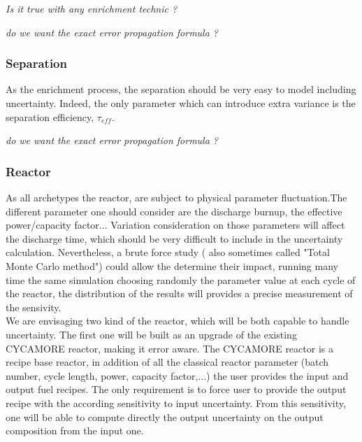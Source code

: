 \documentclass[dvips,12pt]{article}
\begin{document}
\textit{Is it true with any enrichment technic ?}

\textit{do we want the exact error propagation formula ?}

\subsubsection{Separation}
As the enrichment process, the separation should
be very easy to model including
uncertainty. Indeed, the only parameter which can
introduce extra variance is the separation
efficiency, $\tau_{eff}$.



\textit{do we want the exact error propagation formula ?}

\subsubsection{Reactor}
As all archetypes the reactor, are subject to
physical parameter fluctuation.The different
parameter one should consider are the discharge
burnup, the effective power/capacity
factor... Variation consideration on those
parameters will affect the discharge time, which
should be very difficult to include in the
uncertainty calculation. Nevertheless, a brute
force study ( also sometimes called "Total Monte
Carlo method") could allow the determine their
impact, running many time the same simulation
choosing randomly the parameter value at each
cycle of the reactor, the distribution of the
results will provides a precise measurement of the
sensivity.\\

We are envisaging two kind of the reactor, which
will be both capable to handle uncertainty. The
first one will be built as an upgrade of the
existing CYCAMORE reactor, making it error
aware. The CYCAMORE reactor is a recipe base
reactor, in addition of all the classical reactor
parameter (batch number, cycle length, power,
capacity factor,...) the user provides the input
and output fuel recipes. The only requirement is
to force user to provide the output recipe with
the according sensitivity to input
uncertainty. From this sensitivity, one will be
able to compute directly the output uncertainty on
the output composition from the input one.\\
\end{document}
